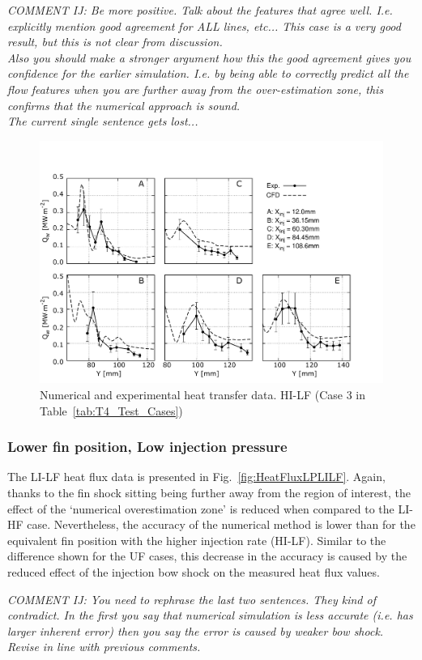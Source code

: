 \documentclass{AIAA}
\begin{document}
{\it COMMENT IJ: Be more positive. Talk about the features that agree well. I.e. explicitly mention good agreement for ALL lines, etc... This case is a very good result, but this is not clear from discussion.\\
Also you should make a stronger argument how this the good agreement gives you confidence for the earlier simulation. I.e. by being able to correctly predict all the flow features when you are further away from the over-estimation zone, this confirms that the numerical approach is sound.\\
The current single sentence gets lost...}


%
\begin{figure}[!h]
\center
\includegraphics[trim = 0mm 3mm 25mm 25mm, clip, width=0.60\columnwidth,valign=t,fbox]{Figures/Data/LP_HI_LF/GNUP_CFD_GaugesLines_Multi.pdf}
\caption{Numerical and experimental heat transfer data. HI-LF (Case 3 in Table~\ref{tab:T4_Test_Cases})}
\label{fig:HeatFluxLPHILF}
\end{figure} 


\subsubsection{Lower fin position, Low injection pressure}
 
The LI-LF heat flux data is presented in Fig.~\ref{fig:HeatFluxLPLILF}.
Again, thanks to the fin shock sitting being further away from the region of interest, the effect of the `numerical overestimation zone' is reduced when compared to the LI-HF case.
Nevertheless, the accuracy of the numerical method is lower than for the equivalent fin position with the higher injection rate (HI-LF).
Similar to the difference shown for the UF cases, this decrease in the accuracy is caused by the reduced effect of the injection bow shock on the measured heat flux values.

{\it COMMENT IJ: You need to rephrase the last two sentences. They kind of contradict. In the first you say that numerical simulation is less accurate (i.e. has larger inherent error) then you say the error is caused by weaker bow shock.\\
Revise in line with previous comments.} 
\end{document}
